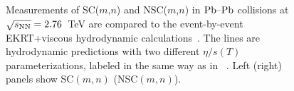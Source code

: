 \begin{figure}[!]
            \begin{center}
              \end{center}
        \caption{Measurements of SC($m$,$n$) and NSC($m$,$n$) in $\textnormal{Pb--Pb}$ collisions at $\sqrt{s_{\textnormal{NN}}}=2.76$~TeV are compared to the event-by-event EKRT+viscous hydrodynamic calculations~\cite{Niemi:2015qia}. The lines are hydrodynamic predictions with two different $\eta/s(T)$ parameterizations, labeled in the same way as in ~\cite{Niemi:2015qia}. Left (right) panels show SC$(m,n)$ (NSC$(m,n)$).}        
        \label{fig:Figure_3}
\end{figure}

